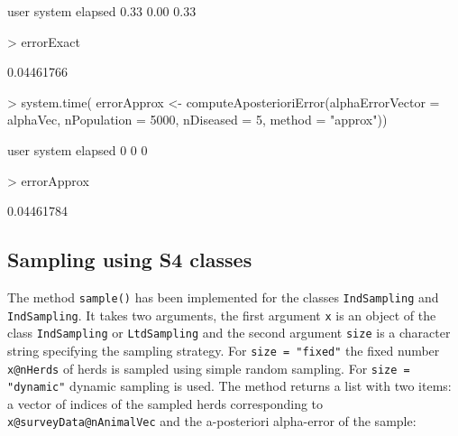 \documentclass[nojss]{jss}
\begin{document}
\begin{Schunk}
\begin{Soutput}
   user  system elapsed 
   0.33    0.00    0.33 
\end{Soutput}
\begin{Sinput}
> errorExact    
\end{Sinput}
\begin{Soutput}
[1] 0.04461766
\end{Soutput}
\begin{Sinput}
> system.time({
   errorApprox <- computeAposterioriError(alphaErrorVector = alphaVec, 
       nPopulation = 5000, nDiseased = 5, method = "approx")})
\end{Sinput}
\begin{Soutput}
   user  system elapsed 
      0       0       0 
\end{Soutput}
\begin{Sinput}
> errorApprox
\end{Sinput}
\begin{Soutput}
[1] 0.04461784
\end{Soutput}
\end{Schunk}



\subsection{Sampling using S4 classes} 
\label{subsec:sampling_with_class}

The method \texttt{sample()} 
has been implemented for the classes \texttt{IndSampling} and 
\texttt{IndSampling}. It takes two arguments, the first argument 
\texttt{x} is an object of the class \texttt{IndSampling} or 
\texttt{LtdSampling} and the second argument \texttt{size} is a 
character string specifying the sampling strategy. For \texttt{size 
= "fixed"} the fixed number \texttt{x@nHerds} of herds is sampled 
using simple random sampling. For \texttt{size = "dynamic"} dynamic 
sampling is used. The method returns a list with two items: a vector 
of indices of the sampled herds corresponding to 
\texttt{x@surveyData@nAnimalVec} and the a-posteriori alpha-error of 
the sample:
\end{document}
